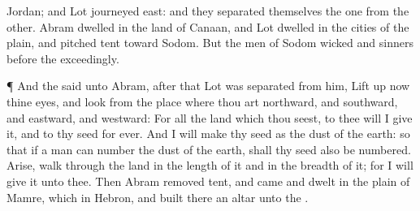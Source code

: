 {Jordan; and
Lot
journeyed
east: and they separated
themselves the
one from the
other.
Abram
dwelled in the
land of
Canaan, and
Lot
dwelled in the
cities of the
plain, and pitched
{}
tent
toward
Sodom.
But the
men of
Sodom
{}
wicked and
sinners before the
{}
exceedingly.
\par }{\PP {}¶ And the
{}
said unto
Abram,
after that
Lot was
separated from him, Lift
up now thine
eyes, and
look from the
place where thou art
northward, and
southward, and
eastward, and
westward:
For all the
land which thou
seest, to thee will I give
it, and to thy
seed
for
ever.
And I will
make thy
seed as the
dust of the
earth: so
that if a
man
can
number the
dust of the
earth,
{} shall thy
seed also be
numbered.
Arise,
walk through the
land in the
length of it and in the
breadth of it; for I will
give it unto thee.
Then
Abram removed
{}
tent, and
came and
dwelt in the
plain of
Mamre, which
{} in
Hebron, and
built there an
altar unto the
{}.

}
